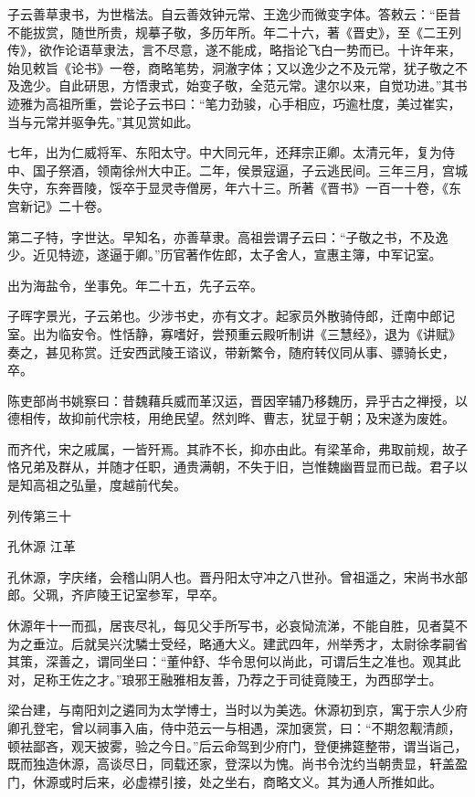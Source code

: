 \documentclass[12pt,UTF8]{ctexbook}
\begin{document}
子云善草隶书，为世楷法。自云善效钟元常、王逸少而微变字体。答敕云：“臣昔不能拔赏，随世所贵，规摹子敬，多历年所。年二十六，著《晋史》，至《二王列传》，欲作论语草隶法，言不尽意，遂不能成，略指论飞白一势而已。十许年来，始见敕旨《论书》一卷，商略笔势，洞澈字体；又以逸少之不及元常，犹子敬之不及逸少。自此研思，方悟隶式，始变子敬，全范元常。逮尔以来，自觉功进。”其书迹雅为高祖所重，尝论子云书曰：“笔力劲骏，心手相应，巧逾杜度，美过崔实，当与元常并驱争先。”其见赏如此。

七年，出为仁威将军、东阳太守。中大同元年，还拜宗正卿。太清元年，复为侍中、国子祭酒，领南徐州大中正。二年，侯景寇逼，子云逃民间。三年三月，宫城失守，东奔晋陵，馁卒于显灵寺僧房，年六十三。所著《晋书》一百一十卷，《东宫新记》二十卷。

第二子特，字世达。早知名，亦善草隶。高祖尝谓子云曰：“子敬之书，不及逸少。近见特迹，遂逼于卿。”历官著作佐郎，太子舍人，宣惠主簿，中军记室。

出为海盐令，坐事免。年二十五，先子云卒。

子晖字景光，子云弟也。少涉书史，亦有文才。起家员外散骑侍郎，迁南中郎记室。出为临安令。性恬静，寡嗜好，尝预重云殿听制讲《三慧经》，退为《讲赋》奏之，甚见称赏。迁安西武陵王谘议，带新繁令，随府转仪同从事、骠骑长史，卒。

陈吏部尚书姚察曰：昔魏藉兵威而革汉运，晋因宰辅乃移魏历，异乎古之禅授，以德相传，故抑前代宗枝，用绝民望。然刘晔、曹志，犹显于朝；及宋遂为废姓。

而齐代，宋之戚属，一皆歼焉。其祚不长，抑亦由此。有梁革命，弗取前规，故子恪兄弟及群从，并随才任职，通贵满朝，不失于旧，岂惟魏幽晋显而已哉。君子以是知高祖之弘量，度越前代矣。





列传第三十

孔休源 江革

孔休源，字庆绪，会稽山阴人也。晋丹阳太守冲之八世孙。曾祖遥之，宋尚书水部郎。父珮，齐庐陵王记室参军，早卒。

休源年十一而孤，居丧尽礼，每见父手所写书，必哀恸流涕，不能自胜，见者莫不为之垂泣。后就吴兴沈驎士受经，略通大义。建武四年，州举秀才，太尉徐孝嗣省其策，深善之，谓同坐曰：“董仲舒、华令思何以尚此，可谓后生之准也。观其此对，足称王佐之才。”琅邪王融雅相友善，乃荐之于司徒竟陵王，为西邸学士。

梁台建，与南阳刘之遴同为太学博士，当时以为美选。休源初到京，寓于宗人少府卿孔登宅，曾以祠事入庙，侍中范云一与相遇，深加褒赏，曰：“不期忽觏清颜，顿袪鄙吝，观天披雾，验之今日。”后云命驾到少府门，登便拂筵整带，谓当诣己，既而独造休源，高谈尽日，同载还家，登深以为愧。尚书令沈约当朝贵显，轩盖盈门，休源或时后来，必虚襟引接，处之坐右，商略文义。其为通人所推如此。
\end{document}
